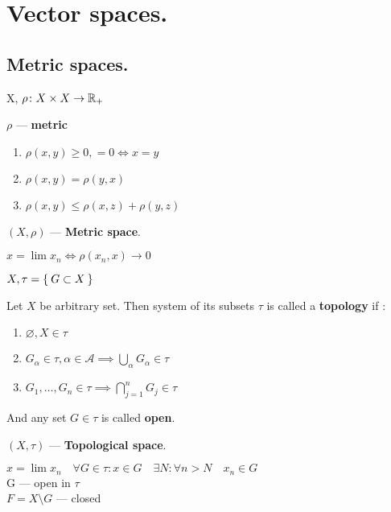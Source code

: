 \chapter{Vector spaces.}
\section{Metric spaces.}

X, $\rho\colon X \times X \to \mathbb{R}_+$
\begin{defn}$\rho$ --- \textbf{metric}
  \begin{enumerate}
    \item $\rho(x, y) \geq 0, = 0 \iff x = y$
    \item $\rho(x, y) = \rho (y, x)$
    \item $\rho(x, y) \leq \rho (x, z) + \rho (y, z)$
  \end{enumerate}
\end{defn}

\begin{defn}$(X, \rho)$ --- \textbf{Metric space}.\end{defn}

\begin{defn}$x = \lim x_{n} \iff \rho(x_{n}, x) \to 0$\end{defn}

$X, \tau = \Set{G \subset X}$

\begin{defn}
  Let $X$ be arbitrary set. Then system of its subsets $\tau$ is called a
  \textbf{topology} if $\colon$
  \begin{enumerate}
  \item $\varnothing, X \in \tau$
  \item $G_\alpha \in \tau, \alpha \in \mathscr{A} \implies
    \bigcup\limits_\alpha G_\alpha \in \tau$
  \item $G_1, \dotsc, G_n \in \tau \implies \bigcap\limits_{j = 1}^n G_j \in
    \tau$
  \end{enumerate}
And any set $G \in \tau$ is called \textbf{open}.
\end{defn}

\begin{defn}$(X, \tau)$ --- \textbf{Topological space}.\end{defn}

$x = \lim x_n \quad \forall G \in \tau: x \in G \quad \exists N: \forall n > N \quad x_n \in G$\\
G --- open in $\tau$ \\
$F = X \setminus G$ --- closed

